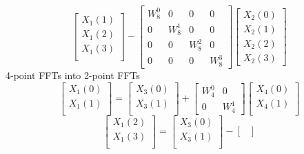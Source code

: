 \documentclass[journal,12pt,twocolumn]{IEEEtran}
\renewcommand\thesection{\arabic{section}}
\begin{document}
\begin{enumerate}[label=\arabic*.,ref=\thesection.\theenumi]
\begin{equation}
\begin{bmatrix}
    X_{1}(1)\\ 
    X_{1}(2)\\
    X_{1}(3)\\
    \end{bmatrix}
    -
    \begin{bmatrix}
    W^{0}_{8} & 0 & 0 & 0\\
    0 & W^{1}_{8} & 0 & 0\\
    0 & 0 & W^{2}_{8} & 0\\
    0 & 0 & 0 & W^{3}_{8}
    \end{bmatrix}
    \begin{bmatrix}
    X_{2}(0) \\ 
    X_{2}(1) \\ 
    X_{2}(2) \\
    X_{2}(3)
    \end{bmatrix}
    \label{8to4_2}
    \end{equation}
    4-point FFTs into 2-point FFTs
    \begin{equation}
    \begin{bmatrix}
    X_{1}(0) \\ 
    X_{1}(1)\\ 
    \end{bmatrix}
    =
    \begin{bmatrix}
    X_{3}(0) \\ 
    X_{3}(1)\\ 
    \end{bmatrix}
    +
    \begin{bmatrix}
    W^{0}_{4} & 0\\
    0 & W^{1}_{4}
    \end{bmatrix}
    \begin{bmatrix}
    X_{4}(0) \\ 
    X_{4}(1) \\ 
    \end{bmatrix}
    \end{equation}
    \label{4to2_1}
    \begin{equation}
    \begin{bmatrix}
    X_{1}(2) \\ 
    X_{1}(3)\\ 
    \end{bmatrix}
    =
    \begin{bmatrix}
    X_{3}(0) \\ 
    X_{3}(1)\\ 
    \end{bmatrix}
    -
    \begin{bmatrix}

\end{bmatrix}
\end{equation}
\end{enumerate}
\end{document}
